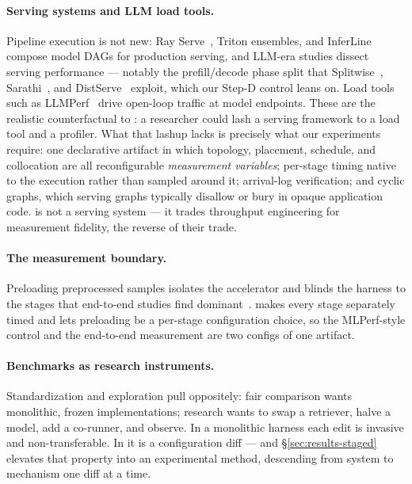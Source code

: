 \paragraph{Serving systems and LLM load tools.} Pipeline execution is not
new: Ray Serve~\cite{moritz2018ray}, Triton ensembles, and
InferLine~\cite{crankshaw2020inferline} compose model DAGs for production
serving, and LLM-era studies dissect serving performance --- notably the
prefill/decode phase split that Splitwise~\cite{patel2024splitwise},
Sarathi~\cite{agrawal2024sarathi}, and DistServe~\cite{zhong2024distserve}
exploit, which our Step-D control leans on. Load tools such as
LLMPerf~\cite{llmperf} drive open-loop traffic at model endpoints. These are
the realistic counterfactual to \sysname{}: a researcher could lash a
serving framework to a load tool and a profiler. What that lashup lacks is
precisely what our experiments require: one declarative artifact in which
topology, placement, schedule, and collocation are all reconfigurable
\emph{measurement variables}; per-stage timing native to the execution
rather than sampled around it; arrival-log verification; and cyclic graphs, which serving graphs typically disallow or bury in opaque application code. \sysname{} is not a serving
system --- it trades throughput engineering for measurement fidelity, the
reverse of their trade.

\paragraph{The measurement boundary.} Preloading preprocessed samples
isolates the accelerator and blinds the harness to the stages that
end-to-end studies find dominant~\cite{coleman2017dawnbench}. \sysname{}
makes every stage separately timed and lets preloading be a per-stage
configuration choice, so the MLPerf-style control and the end-to-end
measurement are two configs of one artifact.

\paragraph{Benchmarks as research instruments.} Standardization and
exploration pull oppositely: fair comparison wants monolithic, frozen
implementations; research wants to swap a retriever, halve a model, add a
co-runner, and observe. In a monolithic harness each edit is invasive and
non-transferable. In \sysname{} it is a configuration diff --- and
\S\ref{sec:results-staged} elevates that property into an experimental
method, descending from system to mechanism one diff at a time.
